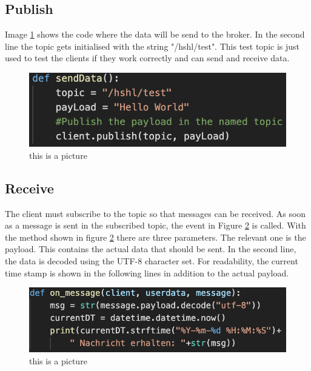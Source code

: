 \subsection{Publish}
Image \ref{sendData} shows the code where the data will be send to the broker. In the second line the topic gets initialised with the string "/hshl/test". This test topic is just used to test the clients if they work correctly and can send and receive data.
\begin{figure}
\sidecaption
\includegraphics[scale=1]{chapters/chapter1_dominic/sendData.png}
\caption{this is a picture}
\label{sendData}
\end{figure}


\subsection{Receive}

The client must subscribe to the topic so that messages can be received. As soon as a message is sent in the subscribed topic, the event in Figure \ref{onMessage} is called.
With the method shown in figure \ref{onMessage} there are three parameters. The relevant one is the payload. This contains the actual data that should be sent. In the second line, the data is decoded using the UTF-8 character set. For readability, the current time stamp is shown in the following lines in addition to the actual payload.
\begin{figure}
\sidecaption
\includegraphics[scale=0.8]{chapters/chapter1_dominic/onMessage.png}
\caption{this is a picture}
\label{onMessage}
\end{figure}


